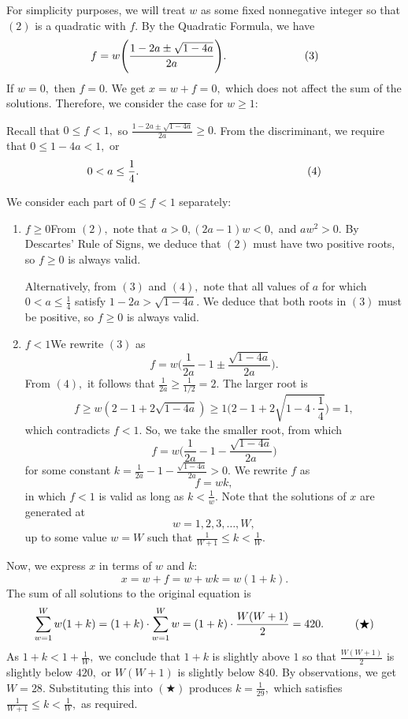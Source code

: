 \begin{enumerate}
 For simplicity purposes, we will treat $w$ as some fixed nonnegative integer so that $(2)$ is a quadratic with $f.$ By the Quadratic Formula, we have 
 \[f=w\Biggl(\frac{1-2a\pm\sqrt{1-4a}}{2a}\Biggr). \hspace{25mm}(3)\]If $w=0,$ then $f=0.$ We get $x=w+f=0,$ which does not affect the sum of the solutions. Therefore, we consider the case for $w\geq1:$

 Recall that $0\leq f<1,$ so $\frac{1-2a\pm\sqrt{1-4a}}{2a}\geq0.$ From the discriminant, we require that $0\leq1-4a<1,$ or 
 \[0<a\leq\frac14. \hspace{54mm}(4)\]

 We consider each part of $0\leq f<1$ separately:

 
            \begin{enumerate} 
        \item $f\geq0$From $(2),$ note that $a>0, (2a-1)w<0,$ and $aw^2>0.$ By Descartes' Rule of Signs, we deduce that $(2)$ must have two positive roots, so $f\geq0$ is always valid.

 Alternatively, from $(3)$ and $(4),$ note that all values of $a$ for which $0<a\leq\frac14$ satisfy $1-2a>\sqrt{1-4a}.$ We deduce that both roots in $(3)$ must be positive, so $f\geq0$ is always valid.

  

 
        \item $f<1$We rewrite $(3)$ as 
 \[f=w\Biggl(\frac{1}{2a}-1\pm\frac{\sqrt{1-4a}}{2a}\Biggr).\] From $(4),$ it follows that $\frac{1}{2a}\geq\frac{1}{1/2}=2.$ The larger root is 
 \[f\geq w\left(2-1+2\sqrt{1-4a}\right) \geq 1\Biggl(2-1+2\sqrt{1-4\cdot\frac14}\Biggr) = 1,\]which contradicts $f<1.$ So, we take the smaller root, from which 
 \[f=w\Biggl(\frac{1}{2a}-1-\frac{\sqrt{1-4a}}{2a}\Biggr)\] for some constant $k=\frac{1}{2a}-1-\frac{\sqrt{1-4a}}{2a}>0.$ We rewrite $f$ as 
 \[f=wk,\] in which $f<1$ is valid as long as $k<\frac 1w.$ Note that the solutions of $x$ are generated at 
 \[w=1,2,3,\ldots,W,\] up to some value $w=W$ such that $\frac{1}{W+1}\leq k<\frac1W.$

            \end{enumerate}
            Now, we express $x$ in terms of $w$ and $k:$ 
 \[x=w+f=w+wk=w(1+k).\]The sum of all solutions to the original equation is 
 \[\sum_{w=1}^{W}w(1+k)=(1+k)\cdot\sum_{w=1}^{W}w=(1+k)\cdot\frac{W(W+1)}{2}=420. \hspace{10mm}(\bigstar)\]As $1+k<1+\frac1W,$ we conclude that $1+k$ is slightly above $1$ so that $\frac{W(W+1)}{2}$ is slightly below $420,$ or $W(W+1)$ is slightly below $840.$ By observations, we get $W=28.$ Substituting this into $(\bigstar)$ produces $k=\frac{1}{29},$ which satisfies $\frac{1}{W+1}\leq k<\frac1W,$ as required.


\end{enumerate}
